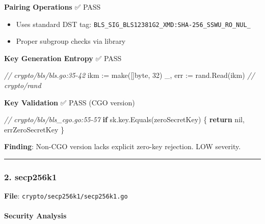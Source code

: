 \documentclass[
]{article}
\newenvironment{Shaded}{}{}
\newcommand{\BuiltInTok}[1]{\textcolor[rgb]{0.00,0.50,0.00}{#1}}
\newcommand{\CommentTok}[1]{\textcolor[rgb]{0.38,0.63,0.69}{\textit{#1}}}
\newcommand{\ControlFlowTok}[1]{\textcolor[rgb]{0.00,0.44,0.13}{\textbf{#1}}}
\newcommand{\DataTypeTok}[1]{\textcolor[rgb]{0.56,0.13,0.00}{#1}}
\newcommand{\DecValTok}[1]{\textcolor[rgb]{0.25,0.63,0.44}{#1}}
\newcommand{\NormalTok}[1]{#1}
\newcommand{\OperatorTok}[1]{\textcolor[rgb]{0.40,0.40,0.40}{#1}}
\newcommand{\OtherTok}[1]{\textcolor[rgb]{0.00,0.44,0.13}{#1}}
\providecommand{\tightlist}{%
  \setlength{\itemsep}{0pt}\setlength{\parskip}{0pt}}
\begin{document}
\textbf{Pairing Operations} ✅ PASS

\begin{itemize}
\tightlist
\item
  Uses standard DST tag:
  \texttt{BLS\_SIG\_BLS12381G2\_XMD:SHA-256\_SSWU\_RO\_NUL\_}
\item
  Proper subgroup checks via library
\end{itemize}

\textbf{Key Generation Entropy} ✅ PASS

\begin{Shaded}
\begin{Highlighting}[]
\CommentTok{// crypto/bls/bls.go:35{-}42}
\NormalTok{ikm }\OperatorTok{:=} \BuiltInTok{make}\OperatorTok{([]}\DataTypeTok{byte}\OperatorTok{,} \DecValTok{32}\OperatorTok{)}
\NormalTok{\_}\OperatorTok{,}\NormalTok{ err }\OperatorTok{:=}\NormalTok{ rand}\OperatorTok{.}\NormalTok{Read}\OperatorTok{(}\NormalTok{ikm}\OperatorTok{)}  \CommentTok{// crypto/rand}
\end{Highlighting}
\end{Shaded}

\textbf{Key Validation} ✅ PASS (CGO version)

\begin{Shaded}
\begin{Highlighting}[]
\CommentTok{// crypto/bls/bls\_cgo.go:55{-}57}
\ControlFlowTok{if}\NormalTok{ sk}\OperatorTok{.}\NormalTok{key}\OperatorTok{.}\NormalTok{Equals}\OperatorTok{(}\NormalTok{zeroSecretKey}\OperatorTok{)} \OperatorTok{\{}
    \ControlFlowTok{return} \OtherTok{nil}\OperatorTok{,}\NormalTok{ errZeroSecretKey}
\OperatorTok{\}}
\end{Highlighting}
\end{Shaded}

\textbf{Finding}: Non-CGO version lacks explicit zero-key rejection. LOW
severity.

\begin{center}\rule{0.5\linewidth}{0.5pt}\end{center}

\subsubsection{2. secp256k1}\label{2-secp256k1}

\textbf{File}: \texttt{crypto/secp256k1/secp256k1.go}

\paragraph{Security Analysis}\label{security-analysis-1}
\end{document}
